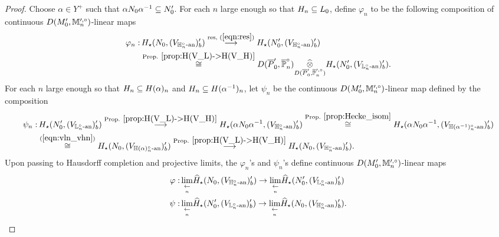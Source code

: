 \documentclass[10pt]{amsart}
\begin{document}
\begin{proof}
Choose $\alpha\in Y^{+}$ such that $\alpha N_{0}\alpha^{-1}\subseteq N_{0}^{\prime}$. For each $n$ large enough so that $H_{n}\subseteq L_{0}$, define $\varphi_{n}$ to be the following composition of continuous $D(M_{0}^{\prime},\mathbb{M}_{n}^{\prime,\circ})$-linear maps \begin{equation*}\begin{split}
    \varphi_{n}: &\, H_{\star}(N_{0},(V_{\mathbb{H}_{n}^{\circ}\textnormal{-an}})^{\prime}_{b}) \overset{\textnormal{res, }(\ref{eqn:res})}{\longrightarrow} H_{\star}(N_{0}^{\prime},(V_{\mathbb{H}_{n}^{\circ}\textnormal{-an}})^{\prime}_{b}) \\
    & \overset{\textnormal{Prop. }\ref{prop:H(V_L)->H(V_H)}}{\cong} D(\overline{P}^{\prime}_{0},\overline{\mathbb{P}}_{n}^{\circ})\underset{D(\overline{P}^{\prime}_{0},\overline{\mathbb{P}}^{\prime,\circ}_{n})}{\widehat{\otimes}} H_{\star}(N_{0}^{\prime},(V_{\mathbb{L}_{n}^{\circ}\textnormal{-an}})^{\prime}_{b}).
\end{split}
\end{equation*}  For each $n$ large enough so that $H_{n}\subseteq H(\alpha)_{n}$ and $H_{n}\subseteq H(\alpha^{-1})_{n}$, let $\psi_{n}$ be the continuous $D(M_{0}^{\prime},\mathbb{M}_{n}^{\prime,\circ})$-linear map defined by the composition \begin{equation*}\begin{split}
    \psi_{n}: & \, H_{\star}(N_{0}^{\prime},(V_{\mathbb{L}_{n}^{\circ}\textnormal{-an}})^{\prime}_{b})  \overset{\textnormal{Prop. } \ref{prop:H(V_L)->H(V_H)}}{\longrightarrow}   H_{\star}(\alpha N_{0}\alpha^{-1},(V_{\mathbb{H}_{n}^{\circ}\textnormal{-an}})^{\prime}_{b}) \overset{\textnormal{Prop. }\ref{prop:Hecke_isom}}{\cong} H_{\star}(\alpha N_{0}\alpha^{-1},(V_{\mathbb{H}(\alpha^{-1})_{n}^{\circ}\textnormal{-an}})^{\prime}_{b}) \\
    & \overset{(\ref{eqn:vln_vhn})}{\cong}H_{\star}(N_{0},(V_{\mathbb{H}(\alpha)_{n}^{\circ}\textnormal{-an}})^{\prime}_{b}) \overset{\textnormal{Prop. } \ref{prop:H(V_L)->H(V_H)}} {\longrightarrow} H_{\star}(N_{0},(V_{\mathbb{H}_{n}^{\circ}\textnormal{-an}})^{\prime}_{b}).
\end{split} 
\end{equation*} Upon passing to Hausdorff completion and projective limits, the $\varphi_{n}$'s and $\psi_{n}$'s define continuous $D(M_{0}^{\prime},\mathbb{M}_{n}^{\prime,\circ})$-linear maps \begin{equation}\label{eqn:inv_of_choice} \begin{split}
    \varphi: & \, \underset{\underset{n}{\leftarrow}}{\lim} \widehat{H}_{\star}(N_{0},(V_{\mathbb{H}_{n}^{\circ}\textnormal{-an}})^{\prime}_{b}) \rightarrow \underset{\underset{n}{\leftarrow}}{\lim} \widehat{H}_{\star}(N_{0}^{\prime},(V_{\mathbb{L}_{n}^{\circ}\textnormal{-an}})^{\prime}_{b}) \\
    \psi: & \,  \underset{\underset{n}{\leftarrow}}{\lim} \widehat{H}_{\star}(N_{0}^{\prime},(V_{\mathbb{L}_{n}^{\circ}\textnormal{-an}})^{\prime}_{b}) \rightarrow \underset{\underset{n}{\leftarrow}}{\lim} \widehat{H}_{\star}(N_{0},(V_{\mathbb{H}_{n}^{\circ}\textnormal{-an}})^{\prime}_{b}).
\end{split} 
\end{equation} 


\end{proof}
\end{document}
